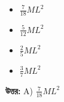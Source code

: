 \documentclass[12pt, a4paper]{article}
\begin{document}
\begin{itemize}[label={}, leftmargin=1cm, itemsep=0.5em]
    \item[\textbf{A)}]$\frac{7}{18} M L^2$
    \item[\textbf{B)}] $\frac{5}{12} M L^2$
    \item[\textbf{C)}]  $\frac{2}{5} M L^2$
    \item[\textbf{D)}]  $\frac{3}{7} M L^2$
\end{itemize}

\vspace{0.5em}
\begin{tcolorbox}[answerbox]
    \textbf{\color{success} উত্তর:} A)  $\frac{7}{18} M L^2$
\end{tcolorbox}
\vspace{1em}
\end{document}
